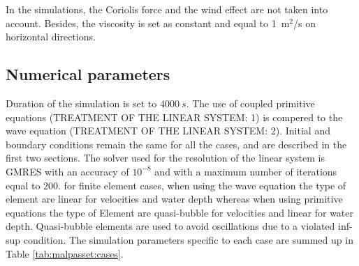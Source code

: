 In the simulations, the Coriolis force and the wind effect are not taken into account. Besides, the viscosity is set as constant and equal to 1~m$^2$/s on horizontal directions.

\subsection{Numerical parameters}
\label{subsection:malpasset:cases}
Duration of the simulation is set to $4000~s$.
The use of coupled primitive equations (TREATMENT OF THE LINEAR SYSTEM: 1)
is compered to the wave equation (TREATMENT OF THE LINEAR SYSTEM: 2).
Initial and boundary conditions remain the same for all the cases, and are described in the first two sections.
The solver used for the resolution of the linear system is GMRES with an accuracy of $10^{-8}$ and with a maximum number
of iterations equal to $200$.
for finite element cases, when using the wave equation the type of element are linear for velocities and water depth
whereas when using primitive equations the type of Element are quasi-bubble for velocities and linear for water depth.
Quasi-bubble elements are used to avoid oscillations due to a violated inf-sup condition.
The simulation parameters specific to each case are summed up in Table \ref{tab:malpasset:cases}.
\begin{table}[H]
  \caption{List of the simulation parameters used for the different cases tested}
  \label{tab:malpasset:cases}
\end{table}

